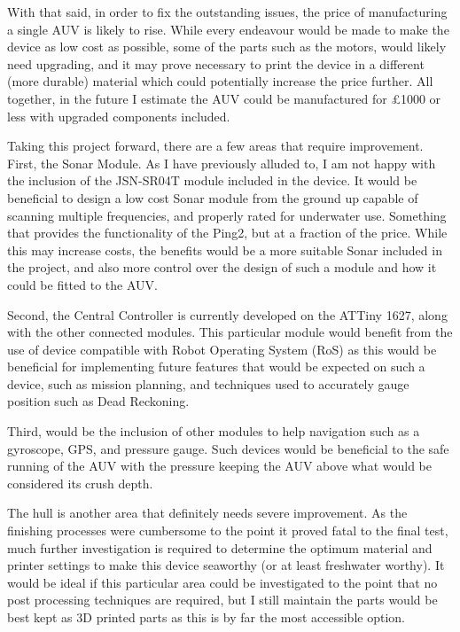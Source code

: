 \documentclass[11pt,a4paper,titlepage]{report}
\begin{document}
	With that said, in order to fix the outstanding issues, the price of manufacturing a single AUV is likely to rise. While every endeavour would be made to make the device as low cost as possible, some of the parts such as the motors, would likely need upgrading, and it may prove necessary to print the device in a different (more durable) material which could potentially increase the price further. All together, in the future I estimate the AUV could be manufactured for \unit{\approx}£1000 or less with upgraded components included. 
	
	Taking this project forward, there are a few areas that require improvement. First, the Sonar Module. As I have previously alluded to, I am not happy with the inclusion of the JSN-SR04T module included in the device. It would be beneficial to design a low cost Sonar module from the ground up capable of scanning multiple frequencies, and properly rated for underwater use. Something that provides the functionality of the Ping2\cite{PING2}, but at a fraction of the price. While this may increase costs, the benefits would be a more suitable Sonar included in the project, and also more control over the design of such a module and how it could be fitted to the AUV. 
	
	Second, the Central Controller is currently developed on the ATTiny 1627, along with the other connected modules. This particular module would benefit from the use of device compatible with Robot Operating System (RoS\cite{ROS}) as this would be beneficial for implementing future features that would be expected on such a device, such as mission planning, and techniques used to accurately gauge position such as Dead Reckoning. 
	
	Third, would be the inclusion of other modules to help navigation such as a gyroscope, GPS, and pressure gauge. Such devices would be beneficial to the safe running of the AUV with the pressure keeping the AUV above what would be considered its crush depth. 
	
	The hull is another area that definitely needs severe improvement. As the finishing processes were cumbersome to the point it proved fatal to the final test, much further investigation is required to determine the optimum material and printer settings to make this device seaworthy (or at least freshwater worthy). It would be ideal if this particular area could be investigated to the point that no post processing techniques are required, but I still maintain the parts would be best kept as 3D printed parts as this is by far the most accessible option. 
	
\end{document}
